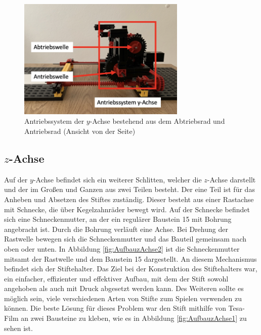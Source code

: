 \documentclass[conference,compsoc,final,a4paper]{IEEEtran}
\begin{document}
\begin{figure}[h]
\centering
\includegraphics[width=8cm]{../images/yAchse2.png}
\caption{Antriebssystem der $y$-Achse bestehend aus dem Abtriebsrad und Antriebsrad (Ansicht von der Seite)}
\label{fig:AufbauyAchse2}
\end{figure}

\subsection{$z$-Achse}

Auf der $y$-Achse befindet sich ein weiterer Schlitten, welcher die $z$-Achse darstellt und der im Großen und Ganzen aus zwei Teilen besteht. 
Der eine Teil ist für das Anheben und Absetzen des Stiftes zuständig. Dieser besteht aus einer Rastachse mit Schnecke, die über
Kegelzahnräder bewegt wird. Auf der Schnecke befindet sich eine Schneckenmutter, an der ein regulärer Baustein 15 mit Bohrung angebracht ist. Durch die Bohrung verläuft eine Achse. Bei Drehung der Rastwelle bewegen sich die Schneckenmutter und das Bauteil gemeinsam nach oben oder unten. In Abbildung \ref{fig:AufbauzAchse2} ist die Schneckenmutter mitsamt der Rastwelle und dem Baustein 15 dargestellt.
An diesem Mechanismus befindet sich der Stiftehalter. Das Ziel bei der Konstruktion des Stiftehalters war, ein einfacher, effizienter und
effektiver Aufbau, mit dem der Stift sowohl angehoben als auch mit Druck abgesetzt werden kann. Des Weiteren sollte es möglich sein, viele
verschiedenen Arten von Stifte zum Spielen verwenden zu können. Die beste Lösung für dieses Problem war den Stift mithilfe von Tesa-Film
an zwei Bausteine zu kleben, wie es in Abbildung \ref{fig:AufbauzAchse1} zu sehen ist. 
\end{document}
